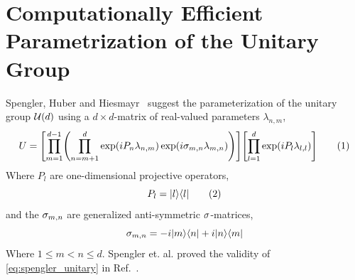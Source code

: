 \documentclass[aps, 10pt, english, twoside, pra, nofootinbib, longbibliography]{revtex4-1}
\theoremstyle{plain}
\theoremstyle{definition}
\theoremstyle{remark}
\newcommand{\tcdot}{} %
\begin{document}
    \section{Computationally Efficient Parametrization of the Unitary Group}
    Spengler, Huber and Hiesmayr~\cite{Spengler_2010_Unitary} suggest the parameterization of the unitary group $\mathcal{U}\br{d}$ using a $d\times d$-matrix of real-valued parameters $\lambda_{n, m}$,
    \[ U = \bs{\prod_{m=1}^{d-1} \br{\prod_{n=m+1}^{d} \exp\br{i P_n \lambda_{n,m}}\exp\br{i \si_{m,n} \lambda_{m,n}}}} \tcdot \bs{\prod_{l=1}^{d} \exp\br{iP_l \lambda_{l,l}}}  \eq \label{eq:spengler_unitary} \]
    Where $P_l$ are one-dimensional projective operators,
    \[ P_l = \ket{l}\bra{l} \eq \label{eq:projective_operator} \]
    and the $\sigma_{m,n}$ are generalized anti-symmetric $\sigma$-matrices,
    \[ \sigma_{m,n} = -i \ket{m}\bra{n} +i \ket{n}\bra{m} \]
    Where $1 \leq m < n \leq d$. Spengler et. al. proved the validity of \cref{eq:spengler_unitary} in Ref.~\cite{Spengler_2010_Unitary}.
\end{document}
